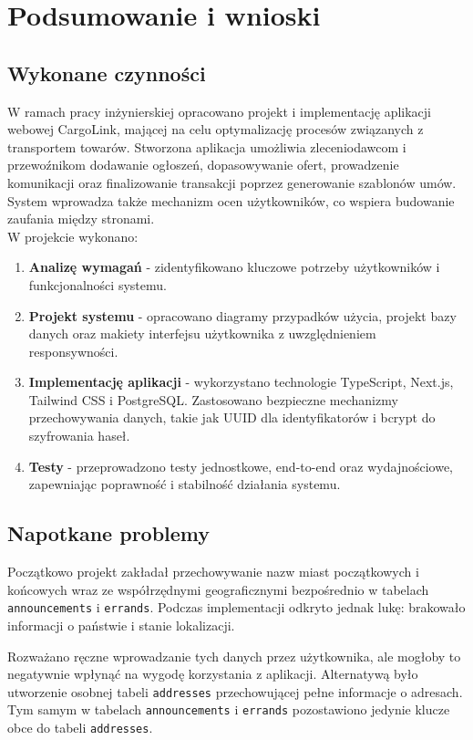 \chapter{Podsumowanie i wnioski}

\section{Wykonane czynności}
W ramach pracy inżynierskiej opracowano projekt i implementację aplikacji webowej CargoLink, mającej na celu optymalizację procesów związanych z transportem towarów. Stworzona aplikacja umożliwia zleceniodawcom i przewoźnikom dodawanie ogłoszeń, dopasowywanie ofert, prowadzenie komunikacji oraz finalizowanie transakcji poprzez generowanie szablonów umów. System wprowadza także mechanizm ocen użytkowników, co wspiera budowanie zaufania między stronami.\\
W projekcie wykonano:
\begin{enumerate}
    \item \textbf{Analizę wymagań} - zidentyfikowano kluczowe potrzeby użytkowników i funkcjonalności systemu.
    \item \textbf{Projekt systemu} - opracowano diagramy przypadków użycia, projekt bazy danych oraz makiety interfejsu użytkownika z uwzględnieniem responsywności.
    \item \textbf{Implementację aplikacji} - wykorzystano technologie TypeScript, Next.js, Tailwind CSS i PostgreSQL. Zastosowano bezpieczne mechanizmy przechowywania danych, takie jak UUID dla identyfikatorów i bcrypt do szyfrowania haseł.
    \item \textbf{Testy} - przeprowadzono testy jednostkowe, end-to-end oraz wydajnościowe, zapewniając poprawność i stabilność działania systemu.
\end{enumerate}

\section{Napotkane problemy}

Początkowo projekt zakładał przechowywanie nazw miast początkowych i końcowych wraz ze współrzędnymi geograficznymi bezpośrednio w tabelach \texttt{announcements} i \texttt{errands}. Podczas implementacji odkryto jednak lukę: brakowało informacji o państwie i stanie lokalizacji.

Rozważano ręczne wprowadzanie tych danych przez użytkownika, ale mogłoby to negatywnie wpłynąć na wygodę korzystania z aplikacji. Alternatywą było utworzenie osobnej tabeli \texttt{addresses} przechowującej pełne informacje o adresach. Tym samym w tabelach \texttt{announcements} i \texttt{errands} pozostawiono jedynie klucze obce do tabeli \texttt{addresses}.

